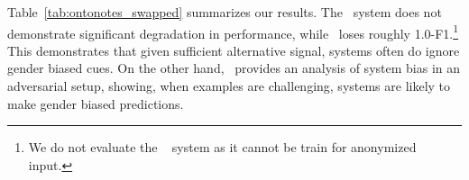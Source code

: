 Table~\ref{tab:ontonotes_swapped} summarizes our results.
The \UW~system does not demonstrate significant degradation in performance, while \Berkeley~loses roughly 1.0-F1.\footnote{We do not evaluate the \Stanford~ system as it cannot be train for anonymized input.}
This demonstrates that given sufficient alternative signal, systems often do ignore gender biased cues.
On the other hand, \dataset~provides an analysis of system bias in an adversarial setup, showing, when examples are challenging, systems are likely to make gender biased predictions.






